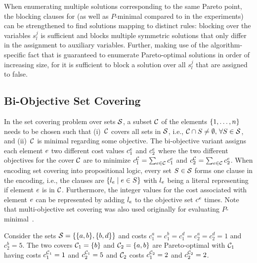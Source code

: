 When enumerating multiple solutions corresponding to the same Pareto point, the blocking clauses for \algname{} (as well as $P$-minimal compared to in the experiments) can be strengthened to find solutions mapping to distinct rules:
blocking over the variables $s_l^j$ is sufficient and blocks multiple symmetric solutions that only differ in the assignment to auxiliary variables.
Further, making use of the algorithm-specific fact that \algname{} is guaranteed to enumerate Pareto-optimal solutions in order of increasing size, for \algname{} it is sufficient to block a solution over all $s_l^j$ that are assigned to false.

\subsection{Bi-Objective Set Covering}

In the set covering problem over sets $\mathcal{S}$, a subset $\mathcal{C}$ of the elements $\{1,\dots,n\}$ needs to be chosen such that (i)~$\mathcal{C}$ covers all sets in $\mathcal{S}$, i.e., $\mathcal{C}\cap S\neq\emptyset,\,\forall S\in\mathcal{S}$, and (ii)~$\mathcal{C}$ is minimal regarding some objective.
The bi-objective variant assigns each element $e$ two different cost values $c^e_1$ and $c^e_2$ where the two different objectives for the cover $\mathcal{C}$ are to minimize $c^{\mathcal{C}}_1 = \sum_{e\in\mathcal{C}}c^e_1$ and $c^{\mathcal{C}}_2 = \sum_{e\in\mathcal{C}}c^e_2$.
When encoding set covering into propositional logic, every set $S\in\mathcal{S}$ forms one clause in the encoding, i.e., the clauses are $\{l_e \mid e\in S\}$ with $l_e$ being a literal representing if element $e$ is in $\mathcal{C}$.
Furthermore, the integer values for the cost associated with element $e$ can be represented by adding $l_e$ to the objective set $c^e$ times.
Note that multi-objective set covering was also used originally for evaluating $P$-minimal~\autocite{DBLP:conf/cp/SohBTB17}.

\begin{example}
  Consider the sets $\mathcal{S} = \{ \{a, b\}, \{b, d\} \}$ and costs $c^a_1 = c^b_1 = c^d_1 = c^a_2 = c^d_2 = 1$ and $c^b_2 = 5$.
  The two covers $\mathcal{C}_1 = \{ b \}$ and $\mathcal{C}_2 = \{ a, b \}$ are Pareto-optimal with $\mathcal{C}_1$ having costs $c^{\mathcal{C}_1}_1 = 1$ and $c^{\mathcal{C}_1}_2 = 5$ and $\mathcal{C}_2$ costs $c^{\mathcal{C}_2}_1 = 2$ and $c^{\mathcal{C}_2}_2 = 2$.
\end{example}

